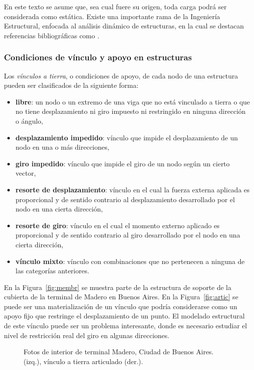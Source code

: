 En este texto se asume que, sea cual fuere su origen, toda carga podrá ser considerada como estática. %
%
Existe una importante rama de la Ingeniería Estructural, enfocada al análisis dinámico de estructuras, en la cual se destacan referencias bibliográficas como \citep{clough1993dynamics}.
%


\subsubsection{Condiciones de vínculo y apoyo en estructuras}

Los \textit{vínculos a tierra}, o condiciones de apoyo, de cada nodo de una estructura pueden ser clasificados de la siguiente forma:
%
\begin{itemize}
\item \textbf{libre}: un nodo o un extremo de una viga que no está vinculado a tierra o que no tiene desplazamiento ni giro impuesto ni restringido en ninguna dirección o ángulo,
%
\item \textbf{desplazamiento impedido}: vínculo que impide el desplazamiento de un nodo en una o más direcciones,
%
\item \textbf{giro impedido}: vínculo que impide el giro de un nodo según un cierto vector,
%
\item \textbf{resorte de desplazamiento}: vínculo en el cual la fuerza externa aplicada es proporcional y de sentido contrario al desplazamiento desarrollado por el nodo en una cierta dirección,
%
\item \textbf{resorte de giro}: vínculo en el cual el momento externo aplicado es proporcional y de sentido contrario al giro desarrollado por el nodo en una cierta dirección,
%
\item \textbf{vínculo mixto}: vínculo con combinaciones que no pertenecen a ninguna de las categorías anteriores.
%
\end{itemize}

En la Figura~\ref{fig:membr} se muestra parte de la estructura de soporte de la cubierta de la terminal de Madero en Buenos Aires. %
%
En la Figura~\ref{fig:artic} se puede ser una materialización de un vínculo que podría considerarse como un apoyo fijo que restringe el desplazamiento de un punto. %
%
El modelado estructural de este vínculo puede ser un problema interesante, donde es necesario estudiar el nivel de restricción real del giro en algunas direcciones. %
%
\begin{figure}[htb]
	\centering
	\caption{Fotos de interior de terminal Madero, Ciudad de Buenos Aires.  (izq.), vínculo a tierra articulado (der.).}
	\label{fig:bsas}
\end{figure}

